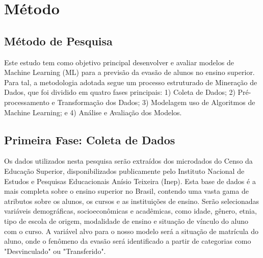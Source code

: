 \documentclass[english, spanish, brazilian]{RBIEarticle} %
\begin{document}

\section{Método}

\subsection{Método de Pesquisa}
Este estudo tem como objetivo principal desenvolver e avaliar modelos de Machine Learning (ML) para a previsão da evasão de alunos no ensino superior. Para tal, a metodologia adotada segue um processo estruturado de Mineração de Dados, que foi dividido em quatro fases principais: 1) Coleta de Dados; 2) Pré-processamento e Transformação dos Dados; 3) Modelagem uso de Algoritmos de Machine Learning; e 4) Análise e Avaliação dos Modelos.

\subsection{Primeira Fase: Coleta de Dados}
Os dados utilizados nesta pesquisa serão extraídos dos microdados do Censo da Educação Superior, disponibilizados publicamente pelo Instituto Nacional de Estudos e Pesquisas Educacionais Anísio Teixeira (Inep). Esta base de dados é a mais completa sobre o ensino superior no Brasil, contendo uma vasta gama de atributos sobre os alunos, os cursos e as instituições de ensino. 
Serão selecionadas variáveis demográficas, socioeconômicas e acadêmicas, como idade, gênero, etnia, tipo de escola de origem, modalidade de ensino e situação de vínculo do aluno com o curso. A variável alvo para o nosso modelo será a situação de matrícula do aluno, onde o fenômeno da evasão será identificado a partir de categorias como "Desvinculado" ou "Transferido".
\end{document}
